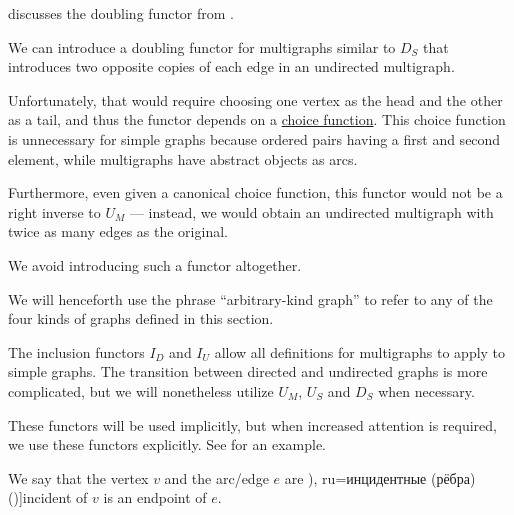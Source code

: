 \begin{comments}
  \item {} discusses the doubling functor from .
  \item We can introduce a doubling functor for multigraphs similar to \hyperref[def:graph_functors/simple_doubling]{\( D_S \)} that introduces two opposite copies of each edge in an undirected multigraph.

  Unfortunately, that would require choosing one vertex as the head and the other as a tail, and thus the functor depends on a \hyperref[def:choice_function]{choice function}. This choice function is unnecessary for simple graphs because ordered pairs having a first and second element, while multigraphs have abstract objects as arcs.

  Furthermore, even given a canonical choice function, this functor would not be a right inverse to \hyperref[def:graph_functors/multi_forgetful]{\( U_M \)} --- instead, we would obtain an undirected multigraph with twice as many edges as the original.

  We avoid introducing such a functor altogether.
\end{comments}

\begin{remark}\label{rem:arbitrary_kind_graph}
  We will henceforth use the phrase \enquote{arbitrary-kind graph} to refer to any of the four kinds of graphs defined in this section.

  The inclusion functors \hyperref[def:graph_functors/directed_inclusion]{\( I_D \)} and \hyperref[def:graph_functors/undirected_inclusion]{\( I_U \)} allow all definitions for multigraphs to apply to simple graphs. The transition between directed and undirected graphs is more complicated, but we will nonetheless utilize \hyperref[def:graph_functors/multi_forgetful]{\( U_M \)}, \hyperref[def:graph_functors/simple_forgetful]{\( U_S \)} and \hyperref[def:graph_functors/simple_doubling]{\( D_S \)} when necessary.

  These functors will be used implicitly, but when increased attention is required, we use these functors explicitly. See  for an example.
\end{remark}

\begin{definition}\label{def:graph_incidence}
  We say that the vertex \( v \) and the arc/edge \( e \) are \term[bg=инцидентни (ребра) (\cite[7]{Мирчев2001}), ru=инцидентные (рёбра) (\cite[9]{Емеличев1990})]{incident} of \( v \) is an endpoint of \( e \).
\end{definition}

